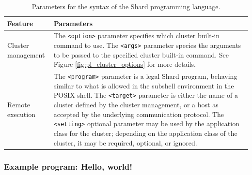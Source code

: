 \documentclass[twoside]{report}
\begin{document}
\begin{table}
  \begin{center}
    \begin{tabularx}{\textwidth}{|l|X|}
      \hline
      Feature            & Parameters                                                                                                                                                                                                                                                                                                                                                                                                                                                                                                                       \\ \hline
      Cluster management & The \texttt{<option>} parameter specifies which cluster built-in command to use. \newline The \texttt{<args>} parameter species the arguments to be passed to the specified cluster built-in command. \newline See Figure \ref{fig:pl_cluster_options} for more details.                                                                                                                                                                                                                                                         \\ \hline
      Remote execution   & The \texttt{<program>} parameter is a legal Shard program, behaving similar to what is allowed in the subshell environment in the POSIX shell. \newline The \texttt{<target>} parameter is either the name of a cluster defined by the cluster management, or a host as accepted by the underlying communication protocol. \newline The \texttt{<setting>} optional parameter may be used by the application class for the cluster; depending on the application class of the cluster, it may be required, optional, or ignored. \\ \hline
    \end{tabularx}
    \caption{Parameters for the syntax of the Shard programming language.}
    \label{fig:pl_syntax_parameters}
  \end{center}
\end{table}

\subsubsection{Example program: Hello, world!}
\end{document}
